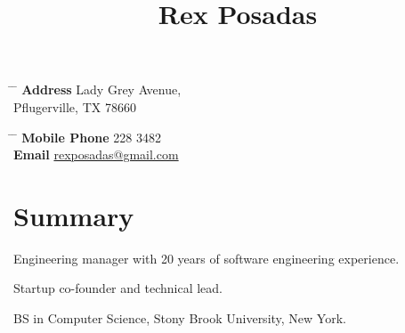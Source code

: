\documentclass[10pt]{article} %
\begin{document}

\title{Rex Posadas} %


\parbox{0.5\textwidth}{ %
\begin{tabbing} %
\hspace{3cm} \= \hspace{4cm} \= \kill %
{\bf Address}  Lady Grey Avenue,\\ %
\> Pflugerville, TX  78660 \\ %
\end{tabbing}}
\hfill %
\parbox{0.5\textwidth}{ %
\begin{tabbing} %
\hspace{3cm} \= \hspace{4cm} \= \kill %
{\bf Mobile Phone}  228 3482 \\ %
{\bf Email} \> \href{mailto:rexposadas@gmail.com}{rexposadas@gmail.com} \\ %
\end{tabbing}}



\section{Summary}

{
\begin{itemize-with-indent}
\item{Engineering manager with 20 years of software engineering experience.}
\item{Startup co-founder and technical lead.}
\item{BS in Computer Science, Stony Brook University, New York.}
\end{itemize-with-indent}
}
\end{document}
